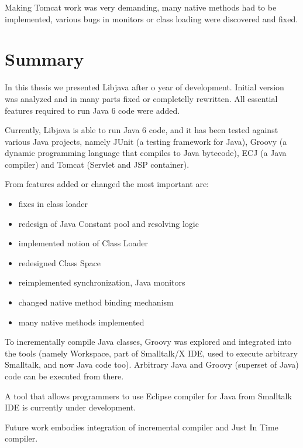 \documentclass[11pt,twoside,a4paper]{book}
\let\Chapter\chapter
\def\chapter{\addtocontents{lol}{\protect\addvspace{10pt}}\Chapter}
\newcommand{\libjava}{{Libjava}}
\begin{document}
Making Tomcat work was very demanding, many native methods had to be implemented, various bugs in monitors or class loading were discovered and fixed. 



\chapter{Summary}
\label{chap:summary}

In this thesis we presented \libjava{} after o year of development.
Initial version was analyzed and in many parts fixed or completelly rewritten.
All essential features required to run Java 6 code were added.

Currently, \libjava{} is able to run Java 6 code, and it has been tested against various Java projects, namely JUnit (a testing framework for Java), Groovy (a dynamic programming language that compiles to Java bytecode), ECJ (a Java compiler) and Tomcat (Servlet and JSP container).

From features added or changed the most important are:

\begin{itemize}
	\item fixes in class loader
	\item redesign of Java Constant pool and resolving logic
	\item implemented notion of Class Loader
	\item redesigned Class Space
	\item reimplemented synchronization, Java monitors
	\item changed native method binding mechanism
	\item many native methods implemented
\end{itemize}

To incrementally compile Java classes, Groovy was explored and integrated into the tools (namely Workspace, part of Smalltalk/X IDE, used to execute arbitrary Smalltalk, and now Java code too). 
Arbitrary Java and Groovy (superset of Java) code can be executed from there.

A tool that allows programmers to use Eclipse compiler for Java from Smalltalk IDE is currently under development.

Future work embodies integration of incremental compiler and Just In Time compiler. 

\end{document}
